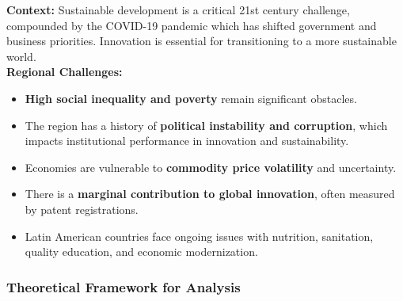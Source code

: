 \documentclass{article}
\begin{document}
    \noindent \textbf{Context:} Sustainable development is a critical 21st
century challenge, compounded by the COVID-19 pandemic which has shifted
government and business priorities. Innovation is essential for
transitioning to a more sustainable world.\\

    \noindent \textbf{Regional Challenges:}
    \begin{itemize}
        \item \textbf{High social inequality and poverty} remain significant
        obstacles.
        \item The region has a history of
        \textbf{political instability and corruption}, which impacts
        institutional performance in innovation and sustainability.
        \item Economies are vulnerable to \textbf{commodity price volatility} and uncertainty.
        \item There is a \textbf{marginal contribution to global innovation}, often measured by patent registrations.
        \item Latin American countries face ongoing issues with nutrition,
        sanitation, quality education, and economic modernization.
    \end{itemize}

    \subsubsection{Theoretical Framework for Analysis}
\end{document}
